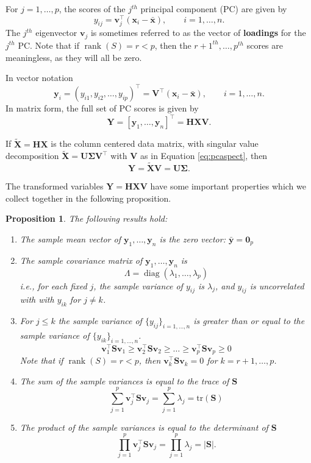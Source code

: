 \documentclass[
]{book}
\newtheorem{proposition}{Proposition}[chapter]
\theoremstyle{definition}
\theoremstyle{definition}
\theoremstyle{definition}
\theoremstyle{definition}
\theoremstyle{remark}
\begin{document}
For \(j=1, \ldots , p\), the scores of the \(j^{th}\) principal component (PC) are given by
\[
y_{ij}=\mathbf v_j^\top(\mathbf x_i - \bar{\mathbf x}), \qquad i=1, \ldots , n.
\]
The \(j^{th}\) eigenvector \(\mathbf v_j\) is sometimes referred to as the vector of \textbf{loadings} for the \(j^{th}\) PC. Note that if \(\operatorname{rank}(S)=r<p\), then the \(r+1^{th}, \ldots, p^{th}\) scores are meaningless, as they will all be zero.

In vector notation
\[
\mathbf y_i=( y_{i1}, y_{i2}, \ldots , y_{ip})^\top = \mathbf V^\top (\mathbf x_i -\bar{\mathbf x}), \qquad i=1, \ldots ,n.
\]
In matrix form, the full set of PC scores is given by
\[
\mathbf Y= [\mathbf y_1 , \ldots , \mathbf y_n]^\top =\mathbf H\mathbf X\mathbf V.
\]

If \(\tilde{\mathbf X}=\mathbf H\mathbf X\) is the column centered data matrix, with singular value decomposition
\(\tilde{\mathbf X}=\mathbf U\boldsymbol{\Sigma}\mathbf V^\top\) with \(\mathbf V\) as in Equation \eqref{eq:pcaspect}, then
\[\mathbf Y= \tilde{\mathbf X}\mathbf V= \mathbf U\boldsymbol{\Sigma}.\]

The transformed variables \(\mathbf Y= \mathbf H\mathbf X\mathbf V\) have some important properties which we collect together in the following proposition.

\begin{proposition}
\protect\hypertarget{prp:pca2}{}{\label{prp:pca2} }The following results hold:

\begin{enumerate}
\def\labelenumi{\arabic{enumi}.}
\item
  The sample mean vector of \(\mathbf y_1, \ldots , \mathbf y_n\) is the zero vector: \(\bar{\mathbf y}={\mathbf 0}_p\)
\item
  The sample covariance matrix of \(\mathbf y_1, \ldots, \mathbf y_n\) is
  \[\Lambda = \operatorname{diag}(\lambda_1, \ldots, \lambda_p)\]
  i.e., for each fixed \(j\), the sample variance of \(y_{ij}\) is \(\lambda_j\), and \(y_{ij}\) is uncorrelated with with \(y_{ik}\) for \(j\not = k\).
\item
  For \(j\leq k\) the sample variance of \(\{y_{ij}\}_{i=1, \ldots , n}\) is greater than or equal to the sample variance of \(\{y_{ik}\}_{i=1, \ldots , n}\).
  \[\mathbf v_1^\top \mathbf S\mathbf v_1 \geq \mathbf v_2^\top \mathbf S\mathbf v_2 \geq \ldots \geq \mathbf v_p^\top \mathbf S\mathbf v_p\geq 0\]
  Note that if \(\operatorname{rank}(S)=r<p\), then \(\mathbf v_k^\top \mathbf S\mathbf v_k = 0\) for \(k=r+1, \ldots, p\).
\item
  The sum of the sample variances is equal to the trace of \(\mathbf S\)
  \[\sum_{j=1}^p \mathbf v_j^\top \mathbf S\mathbf v_j = \sum_{j=1}^p \lambda_j = \text{tr}(\mathbf S)\]
\item
  The product of the sample variances is equal to the determinant of \(\mathbf S\)
  \[\prod_{j=1}^p \mathbf v_j^\top \mathbf S\mathbf v_j = \prod_{j=1}^p \lambda_j = |\mathbf S|.\]
\end{enumerate}
\end{proposition}
\end{document}
